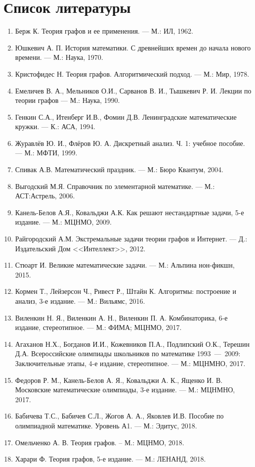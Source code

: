\sloppy
\chapter*{Список литературы}
\begin{enumerate}
\item Берж К. Теория графов и ее применения. --- М.: ИЛ, 1962.
\item Юшкевич А. П. История математики. С древнейших времен до начала нового времени. --- М.: Наука, 1970.
\item Кристофидес Н. Теория графов. Алгоритмический подход. --- М.: Мир, 1978.
\item Емеличев В. А., Мельников О.И., Сарванов В. И., Тышкевич Р. И. Лекции по теории графов --- М.: Наука, 1990.
\item Генкин С.А., Итенберг И.В., Фомин Д.В. Ленинградские математические кружки. --- К.: АСА, 1994.
\item Журавлёв Ю. И., Флёров Ю. А. Дискретный анализ. Ч. 1: учебное пособие. --- М.: МФТИ, 1999.
\item Спивак А.В. Математический праздник. --- М.: Бюро Квантум, 2004.
\item Выгодский М.Я. Справочник по элементарной математике. --- М.: АСТ:Астрель, 2006.
\item Канель-Белов А.Я., Ковальджи А.К. Как решают нестандартные задачи, 5-е издание. --- М.: МЦНМО, 2009.
\item Райгородский А.М. Экстремальные задачи теории графов и Интернет. --- Д.: Издательский Дом <<Интеллект>>, 2012.
\item Стюарт И. Великие математические задачи. --- М.: Альпина нон-фикшн, 2015.
\item Кормен Т., Лейзерсон Ч., Ривест Р., Штайн К. Алгоритмы: построение и анализ, 3-е издание. --- М.: Вильямс, 2016.
\item Виленкин Н. Я., Виленкин А. Н., Виленкин П. А. Комбинаторика, 6-е издание, стереотипное. --- М.: ФИМА; МЦНМО, 2017. 
\item Агаханов Н.Х., Богданов И.И., Кожевников П.А., Подлипский О.К., Терешин Д.А. Всероссийские олимпиады школьников по математике 1993~---~2009: Заключительные этапы, 4-е издание, стереотипное. --- М.: МЦНМНО, 2017. 
\item Федоров Р. М., Канель-Белов А. Я., Ковальджи А. К., Ященко И. В. Московские математические олимпиады, 3-е издание. --- М.: МЦНМНО, 2017. 
\item Бабичева Т.С., Бабичев С.Л., Жогов А. А., Яковлев И.В. Пособие по олимпиадной математике. Уровень А1. --- М.: Эдитус, 2018.
\item Омельченко А. В. Теория графов. -- М.: МЦНМО, 2018.
\item Харари Ф. Теория графов, 5-е издание. --- М.: ЛЕНАНД, 2018.
\end{enumerate}


